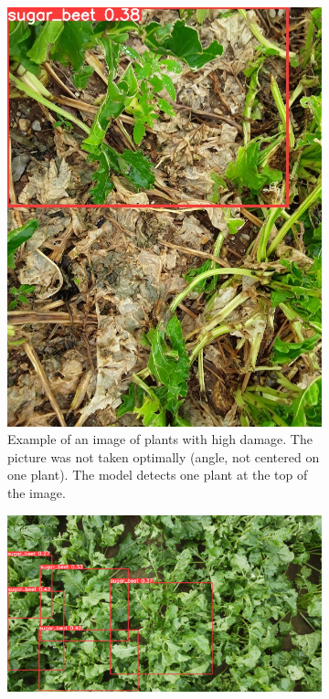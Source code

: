 \begin{figure}[htb!]
\begin{subfigure}{.4\textwidth}
		\includegraphics[scale=0.2]{figures/result_3.jpg}
		\caption{Example of an image of plants with high damage. The picture was not taken optimally (angle, not centered on one plant). The model detects one plant at the top of the image.}
		\label{fig:result_3}
	\end{subfigure}
	\begin{subfigure}{.6\textwidth}
		\centering
		\includegraphics[scale=0.115]{figures/result_4.png}

\end{subfigure}
\end{figure}
